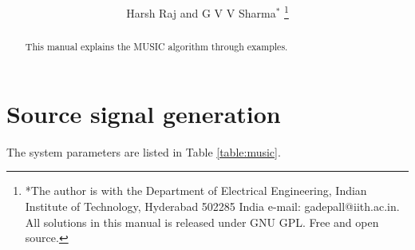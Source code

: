 \documentclass[journal,12pt,twocolumn]{IEEEtran}
\renewcommand\thesection{\arabic{section}}
\begin{document}
\let\StandardTheFigure\thefigure



\makeatletter
{}
\makeatother

\let\StandardTheFigure\thefigure
\let\StandardTheTable\thetable
\let\vec\mathbf





\def\putbox#1#2#3{\makebox[0in][l]{\makebox[#1][l]{}\raisebox{\baselineskip}[0in][0in]{\raisebox{#2}[0in][0in]{#3}}}}
     \def\rightbox#1{\makebox[0in][r]{#1}}
     \def\centbox#1{\makebox[0in]{#1}}
     \def\topbox#1{\raisebox{-\baselineskip}[0in][0in]{#1}}
     \def\midbox#1{\raisebox{-0.5\baselineskip}[0in][0in]{#1}}

\vspace{3cm}

\title{ 
}

\author{ Harsh Raj and G V V Sharma$^{*}$%
	\thanks{*The author is with the Department
		of Electrical Engineering, Indian Institute of Technology, Hyderabad
		502285 India e-mail:  gadepall@iith.ac.in. All solutions in this manual is released under GNU 
GPL.  Free and open source.}
	
}	

\maketitle

\tableofcontents

\bigskip
\renewcommand{\thetable}{\theenumi}
\begin{abstract}
This manual explains the MUSIC algorithm through examples.
\end{abstract}
\section{Source signal generation}
The system parameters are listed in Table \ref{table:music}.
\end{document}
